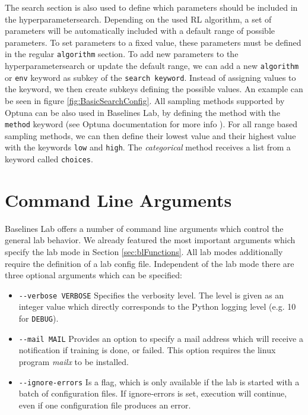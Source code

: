 The search section is also used to define which parameters should be included in the hyperparametersearch. Depending on the used RL algorithm, a set of parameters will be automatically included with a default range of possible parameters. To set parameters to a fixed value, these parameters must be defined in the regular \texttt{algorithm} section. To add new parameters to the hyperparametersearch or update the default range, we can add a new \texttt{algorithm} or \texttt{env} keyword as subkey of the \texttt{search keyword}. Instead of assigning values to the keyword, we then create subkeys defining the possible values. An example can be seen in figure \ref{fig:BasicSearchConfig}. All sampling methods supported by Optuna can be also used in Baselines Lab, by defining the method with the \texttt{method} keyword (see Optuna documentation for more info \cite{optuna-docs}). For all range based sampling methods, we can then define their lowest value and their highest value with the keywords \texttt{low} and \texttt{high}. The \textit{categorical} method receives a list from a keyword called \texttt{choices}.


\section{Command Line Arguments} \label{sec:BLCommandLine}
Baselines Lab offers a number of command line arguments which control the general lab behavior. We already featured the most important arguments which specify the lab mode in Section \ref{sec:blFunctions}. All lab modes additionally require the definition of a lab config file. Independent of the lab mode there are three optional arguments which can be specified:

\begin{itemize}
    \item \texttt{-{}-verbose VERBOSE} Specifies the verbosity level. The level is given as an integer value which directly corresponds to the Python logging level (e.g. 10 for \texttt{DEBUG}).
    \item \texttt{-{}-mail MAIL} Provides an option to specify a mail address which will receive a notification if training is done, or failed. This option requires the linux program \textit{mailx} to be installed.
    \item \texttt{-{}-ignore-errors} Is a flag, which is only available if the lab is started with a batch of configuration files. If ignore-errors is set, execution will continue, even if one configuration file produces an error. 
\end{itemize}


